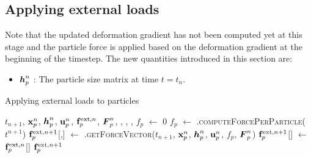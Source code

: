 \subsection{Applying external loads}
Note that the updated deformation gradient has not been computed yet at this stage and the 
particle force is applied based on the deformation gradient at the beginning of the timestep.
The new quantities introduced in this section are:
\begin{itemize} 
  \setlength\itemsep{1pt}
  \item $\boldsymbol{h}_p^n$ : {\Ochre The particle size matrix at time $t = t_n$.}
\end{itemize}
\begin{breakablealgorithm}
  \caption{Applying external loads to particles}
  \begin{algorithmic}[1]
    \Require $t_{n+1}$, $\mathbf{x}_p^n$, $\boldsymbol{h}_p^n$, $\mathbf{u}_p^n$, $\mathbf{f}^{\text{ext},n}_p$, $\boldsymbol{F}_p^n$,
             , , 
             , 
      \State $f_p$ $\leftarrow$ $0$
        \State $f_p$ $\leftarrow$ .\textsc{computeForcePerParticle}($t^{n+1}$)
      \EndIf
            \State $\mathbf{f}^{\text{ext},n+1}_p$[\TTmatl,\TTpart] $\leftarrow$ 
               .\textsc{getForceVector}($t_{n+1}$, $\mathbf{x}_p^n$, $\boldsymbol{h}_p^n$, $\mathbf{u}_p^n$, \WWRP
                  $f_p$, $\boldsymbol{F}_p^{n}$)
          \EndFor
        \Else
          \State $\mathbf{f}^{\text{ext},n+1}_p$[\TTmatl] $\leftarrow$ $\mathbf{f}^{\text{ext},n}_p$[\TTmatl]
        \EndIf
      \EndFor
      \State \Return $\mathbf{f}_p^{\text{ext},n+1}$
    \EndProcedure
  \end{algorithmic}
\end{breakablealgorithm}

